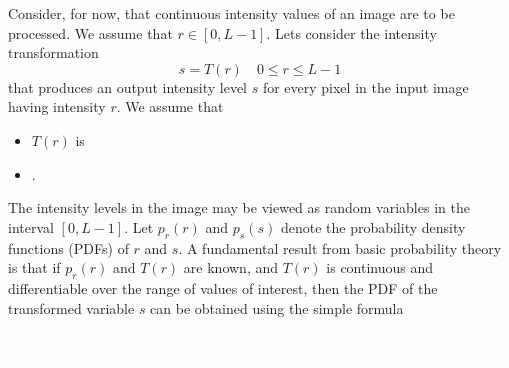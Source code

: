 \begin{frame}[allowframebreaks]
	Consider, for now, that continuous intensity values of an image are to be processed. We assume that $r \in [0, L-1]$. Lets consider the intensity transformation
	\begin{equation}\label{eq:he01}
		s = T(r) \quad 0 \leq r \leq L -1
	\end{equation}
	that produces an output intensity level $s$ for every pixel in the input image having intensity $r$. We assume that	
\begin{itemize}
	\item $T(r)$ is 
	\item {}.
\end{itemize}
The intensity levels in the image may be viewed as random variables in the interval $[0, L-1]$. Let $p_r(r)$ and $p_s(s)$ denote the probability density functions (PDFs) of $r$ and $s$. A fundamental result from basic probability theory is that if $p_r(r)$ and $T(r)$ are known, and $T(r)$ is continuous and differentiable over the range of values of interest, then the PDF of the transformed variable $s$ can be obtained using the simple formula
	\begin{equation}\label{eq:he02}
		\fillblank{p_s(s)  = p_r(r) \left|\frac{dr}{ds}\right|.}
	\end{equation}
	

\end{frame}
